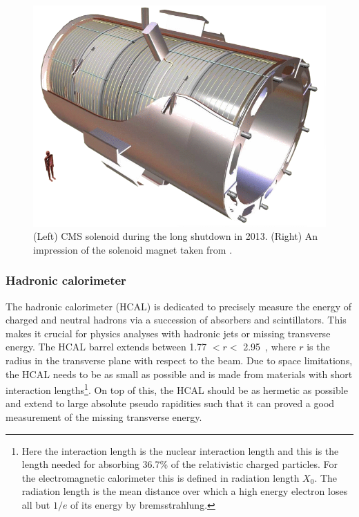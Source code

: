 \begin{figure}[htbp]
\begin{minipage}{0.39\textwidth}
		\includegraphics[width=\textwidth]{2_ExperimentalSetup/Figures/CMS-solenoid-magneta}
	\end{minipage}
		\caption{(Left) CMS solenoid during the long shutdown in 2013. (Right) An impression of the solenoid magnet taken from \cite{solenoid}.}
	
		\label{fig:CMSsolenoid}
	\end{figure}	
	
\subsubsection{Hadronic calorimeter}
\label{sec:HCAL}
The hadronic calorimeter (HCAL) is dedicated to precisely measure the energy of charged and neutral hadrons via a succession of absorbers and scintillators. This makes it crucial for physics analyses with hadronic jets or missing transverse energy. The HCAL barrel extends between 1.77 $<r<$ 2.95~\meter, where $r$ is the radius in the transverse plane with respect to the beam. Due to space limitations, the HCAL needs to be as small as possible and is made from materials with short interaction lengths\footnote{Here the interaction length is the nuclear interaction length and this is the length needed for absorbing 36.7\% of the relativistic charged particles. For the electromagnetic calorimeter this is defined in radiation length $X_0$. The radiation length is the mean distance over which a high energy electron loses all but $1/e$ of its energy by bremsstrahlung.}. 
On top of this, the HCAL should be as hermetic as possible and extend to large absolute pseudo rapidities such that it can proved a good measurement of the missing transverse energy. 

